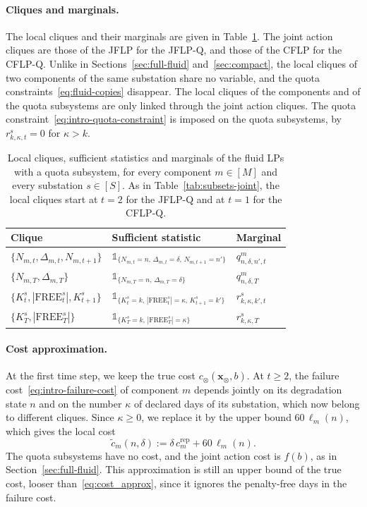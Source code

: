 \documentclass{article}
\begin{document}
\paragraph{Cliques and marginals.}
The local cliques and their marginals are given in Table~\ref{tab:subsets-quota}. The joint action cliques are those of
the JFLP for the JFLP-Q, and those of the CFLP for the CFLP-Q. Unlike in Sections~\ref{sec:full-fluid}
and~\ref{sec:compact}, the local cliques of two components of the same substation share no variable, and the quota
constraints~\eqref{eq:fluid-copies} disappear. The local cliques of the components and of the quota subsystems are only
linked through the joint action cliques. The quota constraint~\eqref{eq:intro-quota-constraint} is imposed on the
quota subsystems, by $r^s_{k,\kappa,t} = 0$ for $\kappa > k$.

\begin{table}[h]
\centering
\small
\renewcommand{\arraystretch}{1.3}
\begin{tabular}{|l|l|l|}
\hline
Clique & Sufficient statistic & Marginal \\
\hline
$\{N_{m,t}, \Delta_{m,t}, N_{m,t+1}\}$ & $\mathds{1}_{\{N_{m,t} = n,\, \Delta_{m,t} = \delta,\, N_{m,t+1} = n'\}}$ &
$q^m_{n,\delta,n',t}$ \\
$\{N_{m,T}, \Delta_{m,T}\}$ & $\mathds{1}_{\{N_{m,T} = n,\, \Delta_{m,T} = \delta\}}$ & $q^m_{n,\delta,T}$ \\
$\{K^s_t, |\text{FREE}^s_t|, K^s_{t+1}\}$ & $\mathds{1}_{\{K^s_t = k,\, |\text{FREE}^s_t| = \kappa,\, K^s_{t+1} =
k'\}}$ & $r^s_{k,\kappa,k',t}$ \\
$\{K^s_T, |\text{FREE}^s_T|\}$ & $\mathds{1}_{\{K^s_T = k,\, |\text{FREE}^s_T| = \kappa\}}$ & $r^s_{k,\kappa,T}$ \\
\hline
\end{tabular}
\caption{Local cliques, sufficient statistics and marginals of the fluid LPs with a quota subsystem, for every
component $m \in [M]$ and every substation $s \in [S]$. As in Table~\ref{tab:subsets-joint}, the local cliques start at
$t = 2$ for the JFLP-Q and at $t = 1$ for the CFLP-Q.}
\label{tab:subsets-quota}
\end{table}

\paragraph{Cost approximation.}
At the first time step, we keep the true cost $c_\otimes(\mathbf{x}_\otimes, b)$. At $t \ge 2$, the failure
cost~\eqref{eq:intro-failure-cost} of component $m$ depends jointly on its degradation state $n$ and on the number
$\kappa$ of declared days of its substation, which now belong to different cliques. Since $\kappa \ge 0$, we replace
it by the upper bound $60\,\ell_m(n)$, which gives the local cost
\[
\tilde c_m(n,\delta) := \delta\, c^{\mathrm{rep}}_m + 60\,\ell_m(n).
\]
The quota subsystems have no cost, and the joint action cost is $f(b)$, as in Section~\ref{sec:full-fluid}. This
approximation is still an upper bound of the true cost, looser than~\eqref{eq:cost_approx}, since it ignores the
penalty-free days in the failure cost.
\end{document}
